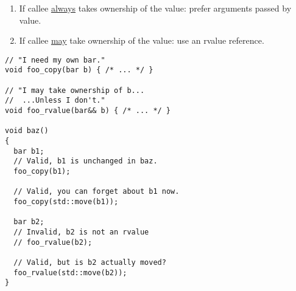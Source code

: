 \begin{enumerate}
\item If callee \underline{always} takes ownership of the value:
  prefer arguments passed by value.
\item If callee \underline{may} take ownership of the value: use an
  rvalue reference.
\end{enumerate}

\begin{lstlisting}
// "I need my own bar."
void foo_copy(bar b) { /* ... */ }

// "I may take ownership of b...
//  ...Unless I don't."
void foo_rvalue(bar&& b) { /* ... */ }

void baz()
{
  bar b1;
  // Valid, b1 is unchanged in baz.
  foo_copy(b1);

  // Valid, you can forget about b1 now.
  foo_copy(std::move(b1));
  
  bar b2;
  // Invalid, b2 is not an rvalue
  // foo_rvalue(b2);

  // Valid, but is b2 actually moved?
  foo_rvalue(std::move(b2));
}
\end{lstlisting}
